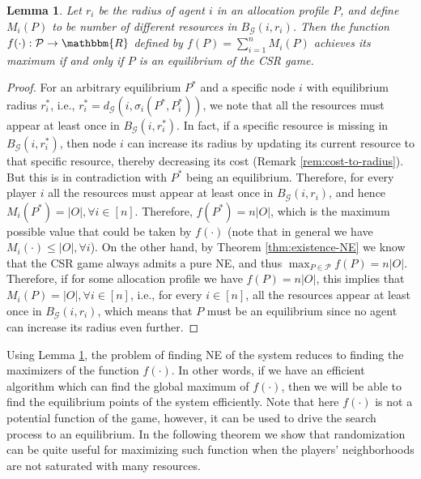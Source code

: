 \documentclass[conference, 10pt, twocolumn]{ieeeconf}
\newcounter{note}
\newtheorem{lemma}{Lemma}
\begin{document}
\smallskip
\begin{lemma}\label{lem:NE-characterization}
Let $r_i$ be the radius of agent $i$ in an allocation profile $P$, and define $M_i(P)$ to be number of different resources in $B_{\mathcal{G}}(i,r_i)$. Then the function $f(\cdot):\mathcal{P}\rightarrow \mathbbm{R}$ defined by $f(P)=\sum_{i=1}^{n}M_i(P)$ achieves its maximum if and only if $P$ is an equilibrium of the CSR game. 
\end{lemma} 
\begin{proof}
For an arbitrary equilibrium $P^*$ and a specific node $i$ with equilibrium radius $r^*_i$, i.e., $r^*_i=d_{\mathcal{G}}(i,\sigma_i(P^*,P^*_i))$, we note that all the resources must appear at least once in $B_{\mathcal{G}}(i,r^*_i)$. In fact, if a specific resource is missing in $B_{\mathcal{G}}(i,r^*_i)$, then node $i$ can increase its radius by updating its current resource to that specific resource, thereby decreasing its cost (Remark \ref{rem:cost-to-radius}). But this is in contradiction with $P^*$ being an equilibrium. Therefore, for every player $i$ all the resources must appear at least once in $B_{\mathcal{G}}(i,r_i)$, and hence $M_i(P^*)=|O|, \forall i\in [n]$. Therefore, $f(P^*)=n|O|$, which is the maximum possible value that could be taken by $f(\cdot)$ (note that in general we have  $M_i(\cdot)\leq |O|, \forall i$). On the other hand, by Theorem \ref{thm:existence-NE} we know that the CSR game always admits a pure NE, and thus $\max_{P\in \mathcal{P}}f(P)=n|O|$. Therefore, if for some allocation profile we have $f(P)=n|O|$, this implies that $M_i(P)=|O|, \forall i\in [n]$, i.e., for every $i\in [n]$, all the resources appear at least once in $B_{\mathcal{G}}(i,r_i)$, which means that $P$ must be an equilibrium since no agent can increase its radius even further.  
\end{proof}

\smallskip
Using Lemma \ref{lem:NE-characterization}, the problem of finding NE of the system reduces to finding the maximizers of the function $f(\cdot)$. In other words, if we have an efficient algorithm which can find the global maximum of $f(\cdot)$, then we will be able to find the equilibrium points of the system efficiently. Note that here $f(\cdot)$ is not a potential function of the game, however, it can be used to drive the search process to an equilibrium. In the following theorem we show that randomization can be quite useful for maximizing such function when the players' neighborhoods are not saturated with many resources. 
\end{document}
